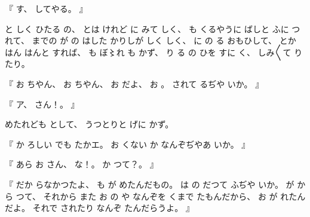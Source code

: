 %
『
す、
%
してやる。
』

%
と
しく
ひたる
の、
%
とは
けれど
に
みて
しく、
%
も
くるやうに
ばしと
ふに
つれて、
%
までの
が
の
はした
かりしが
しく
しく、
%
に
の
る
おもひして、
%
とか
はん
はんと
すれば、
%
も
ぼ〻れ%
も
かず、
%
%
り
る
の
ひを
すに
く、
%
しみ〳〵て
りたり。

%
『
お
ちやん、
%
お
ちやん、
%
お
だよ、
%
お
。
%
されて%
るぢや
いか。
』

%
『
ア、
%
さん！。
』

%
めたれども
として、
%
うつとりと
げに
かず。

%
『
か
ろしい
でも
たかエ。
%
お
くない
か
なんぞぢやあ
いか。
』

%
『
あら
お
さん、
%
な！。
%
か
つて？。
』

%
『
だか
らなかつたよ、
%
も
が
めたんだもの。
%
は
の
だつて
ふぢや
いか。
%
が
から
つて、
%
それから
また
お
の
や
なんぞを
くまで
たもんだから、
%
お
が
れたんだよ。
%
それで
されたり
なんぞ
たんだらうよ。
』

